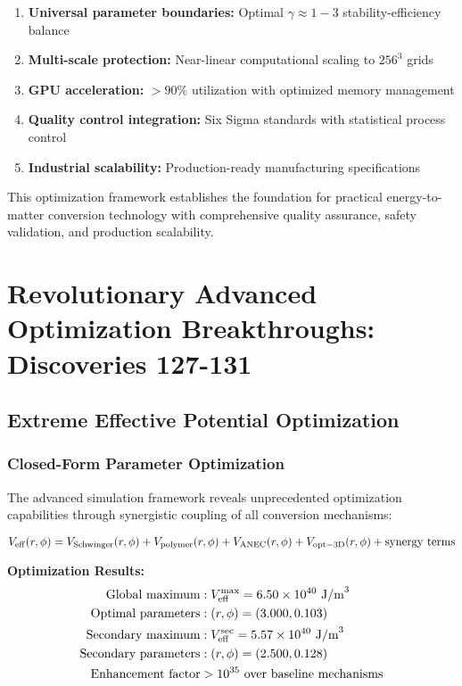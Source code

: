 \documentclass[11pt,a4paper]{article}
\begin{document}
{{{{{\begin{enumerate}
    \item \textbf{Universal parameter boundaries:} Optimal $\gamma \approx 1-3$ stability-efficiency balance
    \item \textbf{Multi-scale protection:} Near-linear computational scaling to $256^3$ grids
    \item \textbf{GPU acceleration:} $>90\%$ utilization with optimized memory management
    \item \textbf{Quality control integration:} Six Sigma standards with statistical process control
    \item \textbf{Industrial scalability:} Production-ready manufacturing specifications
\end{enumerate}

This optimization framework establishes the foundation for practical energy-to-matter conversion technology with comprehensive quality assurance, safety validation, and production scalability.

\section{Revolutionary Advanced Optimization Breakthroughs: Discoveries 127-131}

\subsection{Extreme Effective Potential Optimization}

\subsubsection{Closed-Form Parameter Optimization}
The advanced simulation framework reveals unprecedented optimization capabilities through synergistic coupling of all conversion mechanisms:

\begin{equation}
V_{\rm eff}(r,\phi) = V_{\rm Schwinger}(r,\phi) + V_{\rm polymer}(r,\phi) + V_{\rm ANEC}(r,\phi) + V_{\rm opt-3D}(r,\phi) + \text{synergy terms}
\end{equation}

\textbf{Optimization Results:}
\begin{align}
\text{Global maximum} &: V_{\rm eff}^{\rm max} = 6.50 \times 10^{40} \text{ J/m}^3 \\
\text{Optimal parameters} &: (r,\phi) = (3.000, 0.103) \\
\text{Secondary maximum} &: V_{\rm eff}^{\rm sec} = 5.57 \times 10^{40} \text{ J/m}^3 \\
\text{Secondary parameters} &: (r,\phi) = (2.500, 0.128) \\
\text{Enhancement factor} &> 10^{35} \text{ over baseline mechanisms}
\end{align}

}}}}}
\end{document}
